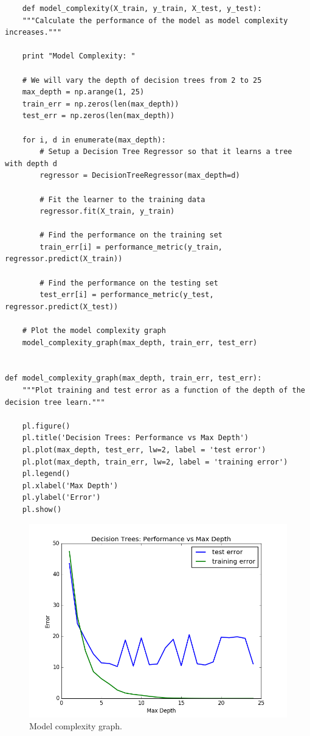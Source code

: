 \documentclass[12 pt]{article}
\numberwithin{equation}{section}
\begin{document}
\begin{verbatim}
	def model_complexity(X_train, y_train, X_test, y_test):
    """Calculate the performance of the model as model complexity increases."""

    print "Model Complexity: "

    # We will vary the depth of decision trees from 2 to 25
    max_depth = np.arange(1, 25)
    train_err = np.zeros(len(max_depth))
    test_err = np.zeros(len(max_depth))

    for i, d in enumerate(max_depth):
        # Setup a Decision Tree Regressor so that it learns a tree with depth d
        regressor = DecisionTreeRegressor(max_depth=d)

        # Fit the learner to the training data
        regressor.fit(X_train, y_train)

        # Find the performance on the training set
        train_err[i] = performance_metric(y_train, regressor.predict(X_train))

        # Find the performance on the testing set
        test_err[i] = performance_metric(y_test, regressor.predict(X_test))

    # Plot the model complexity graph
    model_complexity_graph(max_depth, train_err, test_err)


def model_complexity_graph(max_depth, train_err, test_err):
    """Plot training and test error as a function of the depth of the decision tree learn."""

    pl.figure()
    pl.title('Decision Trees: Performance vs Max Depth')
    pl.plot(max_depth, test_err, lw=2, label = 'test error')
    pl.plot(max_depth, train_err, lw=2, label = 'training error')
    pl.legend()
    pl.xlabel('Max Depth')
    pl.ylabel('Error')
    pl.show()
\end{verbatim}

\begin{figure}[t]
\begin{center}
		\includegraphics[scale=0.5]{model_complexity}
		\caption{Model complexity graph.}
\end{center}
\end{figure}
\end{document}
